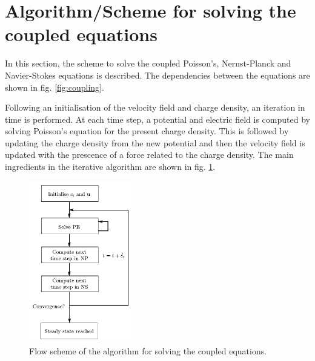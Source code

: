 \section{Algorithm/Scheme for solving the coupled equations}
In this section, the scheme to solve the coupled Poisson's,
Nernst-Planck and Navier-Stokes equations is described. The
dependencies between the equations are shown in
fig. \ref{fig:coupling}.

Following an initialisation of
the velocity field and charge density, an iteration in time is
performed. At each time step, a potential and electric field is
computed by solving Poisson's equation for the present charge
density. This is followed by updating the charge density from the new
potential and then the velocity field is updated with the prescence of
a force related to the charge density. The main ingredients in the
iterative algorithm are shown in fig. \ref{fig:lbm:full_algo}. 

\begin{figure}
\begin{center}
\includegraphics[width=0.4\textwidth]{fig/full_algorithm.pdf}
\end{center}
\caption{Flow scheme of the algorithm for solving the coupled equations.}
\label{fig:lbm:full_algo}
\end{figure}
